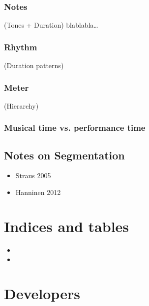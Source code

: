 \documentclass[letterpaper,10pt,english]{sphinxmanual}
\begin{document}
\subsection{Notes}
\label{\detokenize{1_fundamentals:notes}}
(Tones + Duration)
blablabla…


\subsection{Rhythm}
\label{\detokenize{1_fundamentals:rhythm}}
(Duration patterns)


\subsection{Meter}
\label{\detokenize{1_fundamentals:meter}}
(Hierarchy)


\subsection{Musical time vs. performance time}
\label{\detokenize{1_fundamentals:musical-time-vs-performance-time}}

\section{Notes on Segmentation}
\label{\detokenize{1_fundamentals:notes-on-segmentation}}\begin{itemize}
\item {} 
Straus 2005

\item {} 
Hanninen 2012

\end{itemize}


\chapter{Indices and tables}
\label{\detokenize{index:indices-and-tables}}\begin{itemize}
\item {} 

\item {} 

\end{itemize}


\chapter{Developers}
\label{\detokenize{index:developers}}
\end{document}
